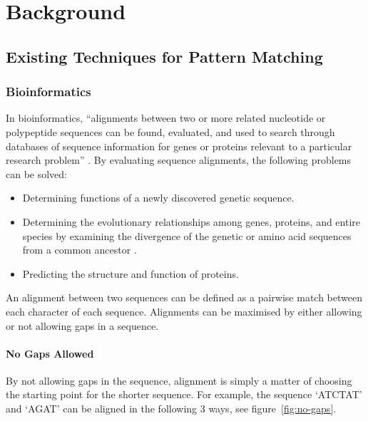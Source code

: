 \chapter{Background\label{chap:background}}

\section{Existing Techniques for Pattern Matching}

\subsection{Bioinformatics}

In bioinformatics, ``alignments between two or more related nucleotide or polypeptide sequences can be found, evaluated, and used to search through databases of sequence information for genes or proteins relevant to a particular research problem'' \citep{krane2003fundamental}.  By evaluating sequence alignments, the following problems can be solved:
\begin{itemize}
    \item Determining functions of a newly discovered genetic sequence.
    \item Determining the evolutionary relationships among genes, proteins, and entire species by examining the divergence of the genetic or amino acid sequences from a common ancestor \citep{krane2003fundamental}.
    \item Predicting the structure and function of proteins.
\end{itemize}

An alignment between two sequences can be defined as a pairwise match between each character of each sequence. Alignments can be maximised by either allowing or not allowing gaps in a sequence.

\subsubsection{No Gaps Allowed}

By not allowing gaps in the sequence, alignment is simply a matter of choosing the starting point for the shorter sequence. For example, the sequence `ATCTAT' and `AGAT' can be aligned in the following 3 ways, see figure~\ref{fig:no-gaps}.

